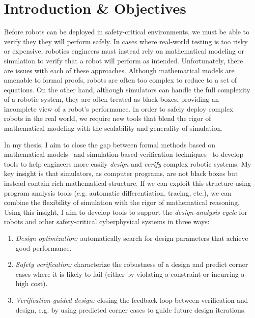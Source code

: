 \chapter{Introduction \& Objectives}\label{section:introduction}

Before robots can be deployed in safety-critical environments, we must be able to verify they they will perform safely. In cases where real-world testing is too risky or expensive, robotics engineers must instead rely on mathematical modeling or simulation to verify that a robot will perform as intended. Unfortunately, there are issues with each of these approaches. Although mathematical models are amenable to formal proofs, robots are often too complex to reduce to a set of equations. On the other hand, although simulators can handle the full complexity of a robotic system, they are often treated as black-boxes, providing an incomplete view of a robot's performance. In order to safely deploy complex robots in the real world, we require new tools that blend the rigor of mathematical modeling with the scalability and generality of simulation.

In my thesis, I aim to close the gap between formal methods based on mathematical models~\cite{beltaFormalMethodsControl2019,kress-gazitSynthesisRobotsGuarantees2018} and simulation-based verification techniques~\cite{zhouRoCUSRobotController2021,corsoSurveyAlgorithmsBlackBox2021,okellyScalableEndtoEndAutonomous2018} to develop tools to help engineers more easily \textit{design} and \textit{verify} complex robotic systems. My key insight is that simulators, as computer programs, are not black boxes but instead contain rich mathematical structure. If we can exploit this structure using program analysis tools (e.g. automatic differentiation, tracing, etc.), we can combine the flexibility of simulation with the rigor of mathematical reasoning.
%
Using this insight, I aim to develop tools to support the \textit{design-analysis cycle} for robots and other safety-critical cyberphysical systems in three ways:
\begin{enumerate}
    \item \textit{Design optimization:} automatically search for design parameters that achieve good performance.
    \item \textit{Safety verification:} characterize the robustness of a design and predict corner cases where it is likely to fail (either by violating a constraint or incurring a high cost).
    \item \textit{Verification-guided design:} closing the feedback loop between verification and design, e.g. by using predicted corner cases to guide future design iterations.
\end{enumerate}

